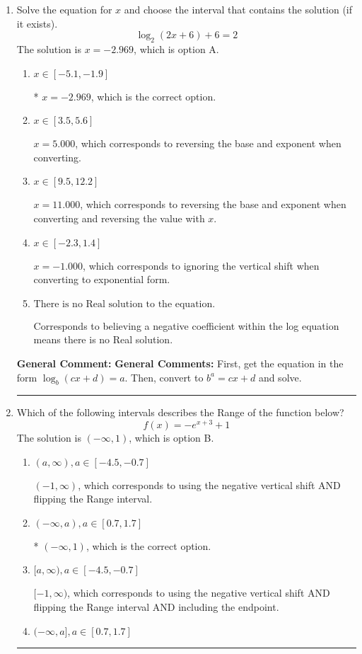 \documentclass{extbook}[14pt]
\newcommand{\litem}[1]{\item #1

\rule{\textwidth}{0.4pt}}
\begin{document}
\begin{enumerate}\litem{
Solve the equation for $x$ and choose the interval that contains the solution (if it exists).
\[ \log_{2}{(2x+6)}+6 = 2 \]The solution is \( x = -2.969 \), which is option A.\begin{enumerate}[label=\Alph*.]
\item \( x \in [-5.1, -1.9] \)

* $x = -2.969$, which is the correct option.
\item \( x \in [3.5, 5.6] \)

$x = 5.000$, which corresponds to reversing the base and exponent when converting.
\item \( x \in [9.5, 12.2] \)

$x = 11.000$, which corresponds to reversing the base and exponent when converting and reversing the value with $x$.
\item \( x \in [-2.3, 1.4] \)

$x = -1.000$, which corresponds to ignoring the vertical shift when converting to exponential form.
\item \( \text{There is no Real solution to the equation.} \)

Corresponds to believing a negative coefficient within the log equation means there is no Real solution.
\end{enumerate}

\textbf{General Comment:} \textbf{General Comments:} First, get the equation in the form $\log_b{(cx+d)} = a$. Then, convert to $b^a = cx+d$ and solve.
}
\litem{
Which of the following intervals describes the Range of the function below?
\[ f(x) = -e^{x+3}+1 \]The solution is \( (-\infty, 1) \), which is option B.\begin{enumerate}[label=\Alph*.]
\item \( (a, \infty), a \in [-4.5, -0.7] \)

$(-1, \infty)$, which corresponds to using the negative vertical shift AND flipping the Range interval.
\item \( (-\infty, a), a \in [0.7, 1.7] \)

* $(-\infty, 1)$, which is the correct option.
\item \( [a, \infty), a \in [-4.5, -0.7] \)

$[-1, \infty)$, which corresponds to using the negative vertical shift AND flipping the Range interval AND including the endpoint.
\item \( (-\infty, a], a \in [0.7, 1.7] \)


\end{enumerate}}
\end{enumerate}
\end{document}
